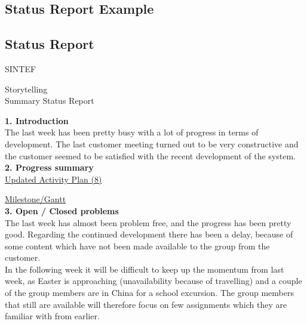 \documentclass[12pt,a4paper,titlepage]{article}
\begin{document}
\begin{appendices}
\section{Status Report Example}
\subsection{Status Report}

\newpage
\thispagestyle{plain}

SINTEF\\
\begin{centering}
Storytelling\\
\huge{Summary Status Report}\\
\end{centering}

\vspace{1cm}
\textbf{1. Introduction}\\

The last week has been pretty busy with a lot of progress in terms of development. The last customer meeting turned out to be very constructive and the customer seemed to be satisfied with the recent development of the system.\\[6pt]

\textbf{2. Progress summary}\\

\href{https://docs.google.com/spreadsheet/ccc?key=0Aigjd3Z4fa8YdGhtR0tqN0d4Q19TR0FmQ2pTVTR1X1E&usp=drive_web#gid=0}{Updated Activity Plan (8)}

\href{https://docs.google.com/spreadsheet/ccc?key=0AlhGbQmvU9bddHl2VWVjWHhiX3VMREc0NWY4UE5hd3c&usp=sharing}{Milestone/Gantt}\\[6pt]

\textbf{3. Open / Closed problems}\\

The last week has almost been problem free, and the progress has been pretty good. Regarding the continued development there has been a delay, because of some content which have not been made available to the group from the customer.\\

In the following week it will be difficult to keep up the momentum from last week, as Easter is approaching (unavailability because of travelling) and a couple of the group members are in China for a school excursion. The group members that still are available will therefore focus on few assignments which they are familiar with from earlier.\\[6pt]


\end{appendices}
\end{document}
